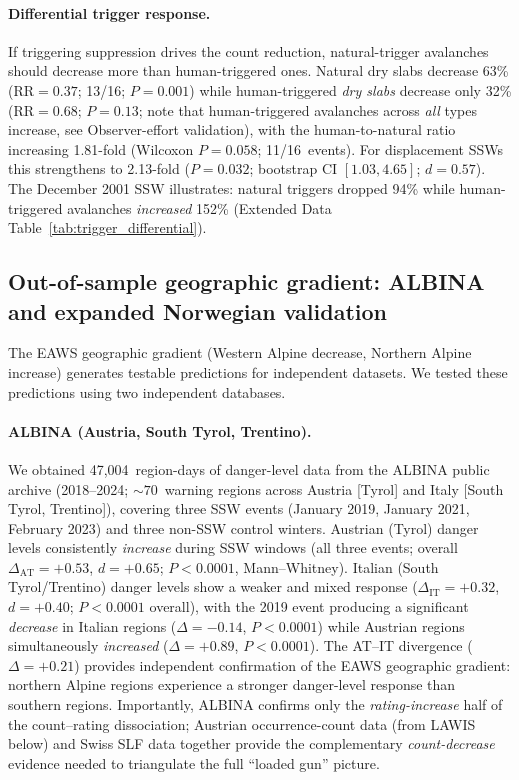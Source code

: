 \documentclass[11pt,letterpaper]{article}
\begin{document}
\paragraph{Differential trigger response.} If triggering suppression drives the count reduction, natural-trigger avalanches should decrease more than human-triggered ones. Natural dry slabs decrease 63\% ($\mathrm{RR} = 0.37$; 13/16; $P = 0.001$) while human-triggered \emph{dry slabs} decrease only 32\% ($\mathrm{RR} = 0.68$; $P = 0.13$; note that human-triggered avalanches across \emph{all} types increase, see Observer-effort validation), with the human-to-natural ratio increasing 1.81-fold (Wilcoxon $P = 0.058$; 11/16~events). For displacement SSWs this strengthens to 2.13-fold ($P = 0.032$; bootstrap CI $[1.03, 4.65]$; $d = 0.57$). The December 2001 SSW illustrates: natural triggers dropped 94\% while human-triggered avalanches \emph{increased} 152\% (Extended Data Table~\ref{tab:trigger_differential}).

\subsection*{Out-of-sample geographic gradient: ALBINA and expanded Norwegian validation}

The EAWS geographic gradient (Western Alpine decrease, Northern Alpine increase) generates testable predictions for independent datasets. We tested these predictions using two independent databases.

\paragraph{ALBINA (Austria, South Tyrol, Trentino).} We obtained 47,004~region-days of danger-level data from the ALBINA public archive (2018--2024; ${\sim}70$~warning regions across Austria [Tyrol] and Italy [South Tyrol, Trentino]), covering three SSW events (January 2019, January 2021, February 2023) and three non-SSW control winters. Austrian (Tyrol) danger levels consistently \emph{increase} during SSW windows (all three events; overall $\Delta_{\mathrm{AT}} = +0.53$, $d = +0.65$; $P < 0.0001$, Mann--Whitney). Italian (South Tyrol/Trentino) danger levels show a weaker and mixed response ($\Delta_{\mathrm{IT}} = +0.32$, $d = +0.40$; $P < 0.0001$ overall), with the 2019 event producing a significant \emph{decrease} in Italian regions ($\Delta = -0.14$, $P < 0.0001$) while Austrian regions simultaneously \emph{increased} ($\Delta = +0.89$, $P < 0.0001$). The AT--IT divergence ($\Delta = +0.21$) provides independent confirmation of the EAWS geographic gradient: northern Alpine regions experience a stronger danger-level response than southern regions. Importantly, ALBINA confirms only the \emph{rating-increase} half of the count--rating dissociation; Austrian occurrence-count data (from LAWIS below) and Swiss SLF data together provide the complementary \emph{count-decrease} evidence needed to triangulate the full ``loaded gun'' picture.
\end{document}
